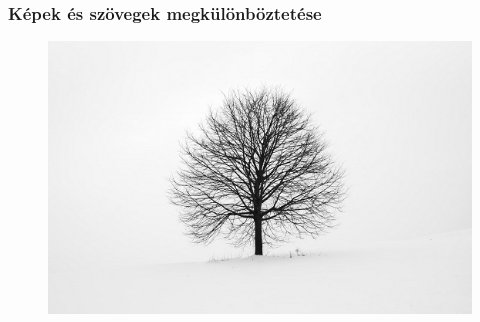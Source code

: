 \documentclass{beamer}
\begin{document}
\begin{frame}[fragile]
\begin{figure}[!tbp]
\begin{minipage}[b]{0.3\textwidth}
  \end{minipage}
\end{figure}

\end{frame}

\begin{frame}[fragile]
\frametitle{Képek és szövegek megkülönböztetése}

\begin{figure}[!tbp]
  \centering
  \begin{minipage}[b]{1\textwidth}
    \includegraphics[width=\textwidth]{images/tree.png}
  \end{minipage}
\end{figure}

\end{frame}
\end{document}
